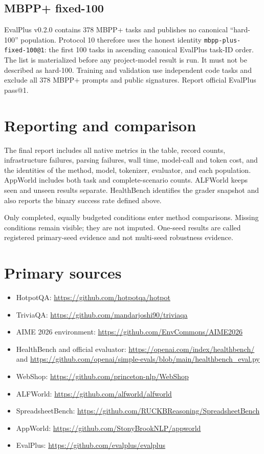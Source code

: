 \documentclass[11pt]{article}
\begin{document}
\subsection{MBPP+ fixed-100}

EvalPlus v0.2.0 contains 378 MBPP+ tasks and publishes no canonical
``hard-100'' population.  Protocol 10 therefore uses the honest identity
\texttt{mbpp-plus-fixed-100@1}: the first 100 tasks in ascending canonical
EvalPlus task-ID order.  The list is materialized before any project-model
result is run.  It must not be described as hard-100.  Training and validation
use independent code tasks and exclude all 378 MBPP+ prompts and public
signatures.  Report official EvalPlus pass@1.

\section{Reporting and comparison}

The final report includes all native metrics in the table, record counts,
infrastructure failures, parsing failures, wall time, model-call and token
cost, and the identities of the method, model, tokenizer, evaluator, and each
population.  AppWorld includes both task and complete-scenario counts.
ALFWorld keeps seen and unseen results separate.  HealthBench identifies the
grader snapshot and also reports the binary success rate defined above.

Only completed, equally budgeted conditions enter method comparisons.  Missing
conditions remain visible; they are not imputed.  One-seed results are called
registered primary-seed evidence and not multi-seed robustness evidence.

\section{Primary sources}

\begin{itemize}
  \item HotpotQA: \url{https://github.com/hotpotqa/hotpot}
  \item TriviaQA: \url{https://github.com/mandarjoshi90/triviaqa}
  \item AIME 2026 environment: \url{https://github.com/EnvCommons/AIME2026}
  \item HealthBench and official evaluator:
    \url{https://openai.com/index/healthbench/} and
    \url{https://github.com/openai/simple-evals/blob/main/healthbench_eval.py}
  \item WebShop: \url{https://github.com/princeton-nlp/WebShop}
  \item ALFWorld: \url{https://github.com/alfworld/alfworld}
  \item SpreadsheetBench: \url{https://github.com/RUCKBReasoning/SpreadsheetBench}
  \item AppWorld: \url{https://github.com/StonyBrookNLP/appworld}
  \item EvalPlus: \url{https://github.com/evalplus/evalplus}
\end{itemize}
\end{document}
